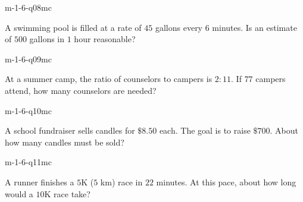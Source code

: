 \begin{practiceQuestion}{m-1-6-q08}{mc}
\begin{questionText}
A swimming pool is filled at a rate of $45$ gallons every $6$ minutes. Is an estimate of $500$ gallons in $1$ hour reasonable?
\end{questionText}
\end{practiceQuestion}

\begin{practiceQuestion}{m-1-6-q09}{mc}
\begin{questionText}
At a summer camp, the ratio of counselors to campers is $2 : 11$. If $77$ campers attend, how many counselors are needed?
\end{questionText}
\end{practiceQuestion}

\begin{practiceQuestion}{m-1-6-q10}{mc}
\begin{questionText}
A school fundraiser sells candles for $\$8.50$ each. The goal is to raise $\$700$. About how many candles must be sold?
\end{questionText}
\end{practiceQuestion}

\begin{practiceQuestion}{m-1-6-q11}{mc}
\begin{questionText}
A runner finishes a $5$K ($5$ km) race in $22$ minutes. At this pace, about how long would a $10$K race take?
\end{questionText}
\end{practiceQuestion}

